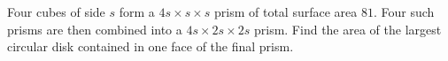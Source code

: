 Four cubes of side $s$ form a $4s\times s\times s$ prism of total surface area $81$. Four such prisms are then combined into a $4s\times2s\times2s$ prism. Find the area of the largest circular disk contained in one face of the final prism.
